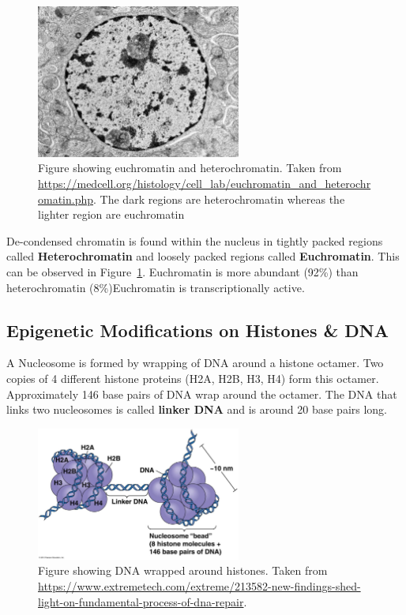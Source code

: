 \documentclass[letterpaper,12pt]{article}
\begin{document}
\begin{figure}[h!]
	\centering
	\includegraphics[width=0.6\textwidth]{figures/euchromatin_vs_heterochromatin.jpg}
	\caption{Figure showing euchromatin and heterochromatin. Taken from \url{https://medcell.org/histology/cell_lab/euchromatin_and_heterochromatin.php}. The dark regions are heterochromatin whereas the lighter region are euchromatin}\label{fig2}
\end{figure}

De-condensed chromatin is found within the nucleus in tightly packed regions called \textbf{Heterochromatin} and loosely packed regions called \textbf{Euchromatin}. This can be observed in Figure~\ref{fig2}. Euchromatin is more abundant (92\%) than heterochromatin (8\%)Euchromatin is transcriptionally active.

\subsection{Epigenetic Modifications on Histones \& DNA}

A Nucleosome is formed by wrapping of DNA around a histone octamer. Two copies of 4 different histone proteins (H2A, H2B, H3, H4) form this octamer. Approximately 146 base pairs of DNA wrap around the octamer. The DNA that links two nucleosomes is called \textbf{linker DNA} and is around 20 base pairs long.

\begin{figure}[!h]
	\centering
	\includegraphics[width=0.6\textwidth]{figures/histones.jpeg}
	\caption{Figure showing DNA wrapped around histones. Taken from \url{https://www.extremetech.com/extreme/213582-new-findings-shed-light-on-fundamental-process-of-dna-repair}.}\label{fig3}
\end{figure}
\end{document}

